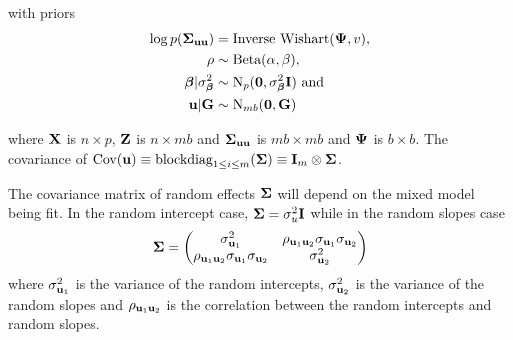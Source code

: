 \noindent with priors
\begin{align*}
	\log{p({\boldsymbol\Sigma}_{{\bf u}{\bf u}})} & = \text{Inverse Wishart}({\boldsymbol \Psi}, v),    \\
	\rho                       & \sim \text{Beta}(\alpha, \beta),             \\
	{\boldsymbol \beta}|\sigma^2_{\boldsymbol \beta}     & \sim \text{N}_p({\bf 0}, \sigma^2_{\boldsymbol \beta} {\bf I}) \text{ and } \\
	{\bf u}|{\bf G}       & \sim \text{N}_{mb}({\bf 0}, {\bf G})              
\end{align*}

\noindent where ${\bf X}$ is $n \times p$, ${\bf Z}$ is $n \times mb$ and ${\boldsymbol \Sigma}_{{\bf u} {\bf u}}$ is $mb \times mb$ and
${\boldsymbol \Psi}$ is $b \times b$. The covariance of $\mbox{Cov}({\bf u}) \equiv \text{blockdiag}_{1 \leq i \leq m} ({\boldsymbol \Sigma}) \equiv
{\bf I}_m \otimes {\boldsymbol\Sigma}$.

The covariance matrix of random effects ${\boldsymbol \Sigma}$ will depend on the mixed model being fit. In the random
intercept case, ${\boldsymbol \Sigma} = \sigma_u^2 {\bf I}$ while in the random slopes case
\[
	{\boldsymbol \Sigma} = 
	\begin{pmatrix}
		\sigma_{{\bf u}_1}^2                                 & \rho_{{\bf u}_1 {\bf u}_2} \sigma_{{\bf u}_1} \sigma_{{\bf u}_2} \\
		\rho_{{\bf u}_1 {\bf u}_2} \sigma_{{\bf u}_1} \sigma_{{\bf u}_2} & \sigma_{{\bf u}_2}^2                                 
	\end{pmatrix}
\]
where $\sigma_{{\bf u}_1}^2$ is the variance of the random intercepts, $\sigma_{{\bf u}_2}^2$ is the variance of the
random slopes and $\rho_{{\bf u}_1 {\bf u}_2}$ is the correlation between the random intercepts and random slopes.



